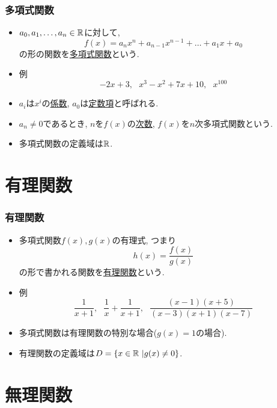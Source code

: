 \begin{frame}
\frametitle{多項式関数}

\begin{itemize}
\item 
$a_0,a_1,\dots,a_n \in \mathbb{R}$に対して, 
$$
f(x)=a_nx^n+a_{n-1}x^{n-1}+\dots+a_1x+a_0
$$
の形の関数を\underline{多項式関数}という. 
\item 例
$$
-2x+3, \ \ \ x^3-x^2+7x+10, \ \ \ x^{100} 
$$
\item $a_i$は$x^i$の\underline{係数}, $a_0$は\underline{定数項}と呼ばれる. 
\item $a_n \neq 0$であるとき, $n$を$f(x)$の\underline{次数}, $f(x)$を$n$次多項式関数という. 
\item 多項式関数の定義域は$\mathbb{R}$. 
\end{itemize}

\end{frame}





\section{有理関数}

\begin{frame}
\frametitle{有理関数}

\begin{itemize}
\item 
多項式関数$f(x),g(x)$の有理式, つまり
$$
h(x)=\frac{f(x)}{g(x)}
$$
の形で書かれる関数を\underline{有理関数}という. 
\item 例
$$
\frac{1}{x+1}, \ \ \ \frac{1}{x}+\frac{1}{x+1}, \ \ \ \frac{(x-1)(x+5)}{(x-3)(x+1)(x-7)}
$$
\item 多項式関数は有理関数の特別な場合($g(x)=1$の場合). 
\item 有理関数の定義域は$D=\{ x \in \mathbb{R} \ | g(x) \neq 0\}$.
\end{itemize}

\end{frame}




\section{無理関数}

